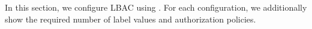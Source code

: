 %

In this section, we configure LBAC  using \labacOneOneOne{}. For each configuration, we additionally show the required number of label values and authorization policies. 

	